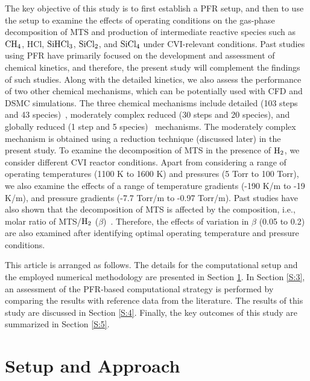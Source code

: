 \documentclass[final, letterpaper, square, comma, numbers, sort&compress]{elsarticle}
\begin{document}
The key objective of this study is to first establish a PFR setup, and then to use the setup to examine the effects of operating conditions on the gas-phase decomposition of MTS and production of intermediate reactive species such as $\rm CH_4$, HCl, $\rm SiHCl_3$, $\rm SiCl_2$, and $\rm SiCl_4$ under CVI-relevant conditions. Past studies using PFR have primarily focused on the development and assessment of chemical kinetics, and therefore, the present study will complement the findings of such studies. Along with the detailed kinetics, we also assess the performance of two other chemical mechanisms, which can be potentially used with CFD and DSMC simulations. The three chemical mechanisms include detailed (103 steps and 43 species)~\cite{Ge2007A,Ge2007B,Ge2010}, moderately complex reduced (30 steps and 20 species), and globally reduced (1 step and 5 species)~\cite{Mousavipour2004} mechanisms. The moderately complex mechanism is obtained using a reduction technique (discussed later) in the present study. To examine the decomposition of MTS in the presence of $\rm H_2$, we consider different CVI reactor conditions. Apart from considering a range of operating temperatures (1100 K to 1600 K) and pressures (5 Torr to 100 Torr), we also examine the effects of a range of temperature gradients (-190 K/m to -19 K/m), and pressure gradients (-7.7 Torr/m to -0.97 Torr/m). Past studies have also shown that the decomposition of MTS is affected by the composition, i.e., molar ratio of MTS/$\rm H_2$ ($\beta$)~\cite{Peng2021}. Therefore, the effects of variation in $\beta$ (0.05 to 0.2) are also examined after identifying optimal operating temperature and pressure conditions. 

This article is arranged as follows. The details for the computational setup and the employed numerical methodology are presented in Section \ref{S:2}. In Section \ref{S:3}, an assessment of the PFR-based computational strategy is performed by comparing the results with reference data from the literature. The results of this study are discussed in Section \ref{S:4}. Finally, the key outcomes of this study are summarized in Section \ref{S:5}.

\section{Setup and Approach}
\label{S:2}
\end{document}
